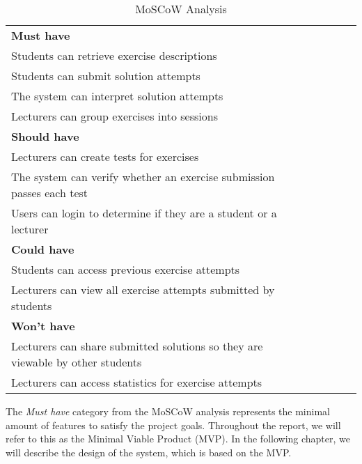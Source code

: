 \begin{table}[H]
    \begin{tabular}{|l|llll}
    \cline{1-1}
    \cellcolor[HTML]{C0C0C0}\textbf{Must have}                                     &  &  &  &  \\ \cline{1-1}
    Students can retrieve exercise descriptions                                    &  &  &  &  \\ \cline{1-1}
    Students can submit solution attempts                                          &  &  &  &  \\ \cline{1-1}
    The system can interpret solution attempts                                     &  &  &  &  \\ \cline{1-1}
    Lecturers can group exercises into sessions                                    &  &  &  &  \\ \cline{1-1}
    \cellcolor[HTML]{C0C0C0}\textbf{Should have}                                   &  &  &  &  \\ \cline{1-1}
    Lecturers can create tests for exercises                                       &  &  &  &  \\ \cline{1-1}
    The system can verify whether an exercise submission passes each test          &  &  &  &  \\ \cline{1-1}
    Users can login to determine if they are a student or a lecturer               &  &  &  &  \\ \cline{1-1}
    \cellcolor[HTML]{C0C0C0}\textbf{Could have}                                    &  &  &  &  \\ \cline{1-1}
    Students can access previous exercise attempts                                 &  &  &  &  \\ \cline{1-1}
    Lecturers can view all exercise attempts submitted by students                 &  &  &  &  \\ \cline{1-1}
    \cellcolor[HTML]{C0C0C0}\textbf{Won't have}                                    &  &  &  &  \\ \cline{1-1}
    Lecturers can share submitted solutions so they are viewable by other students &  &  &  &  \\ \cline{1-1}
    Lecturers can access statistics for exercise attempts                          &  &  &  &  \\ \cline{1-1}
    \end{tabular}
    \caption{\label{tab:MoSCoW}MoSCoW Analysis}
\end{table}

The \textit{Must have} category from the MoSCoW analysis represents the minimal amount of features to satisfy the project goals. Throughout the report, we will refer to this as the Minimal Viable Product (MVP).
In the following chapter, we will describe the design of the system, which is based on the MVP.
